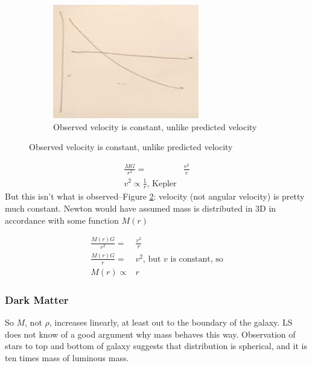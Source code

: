 \documentclass[]{article}
\begin{document}
\begin{figure}[H]
\begin{subfigure}[t]{0.45\textwidth}
	\end{subfigure}
	\begin{subfigure}[t]{0.45\textwidth}
		\caption{Observed velocity is constant, unlike predicted velocity}\label{fig:cosmo-6-velocity-curve}
		\includegraphics[width=\textwidth]{cosmo-6-velocity-curve}
	\end{subfigure}	
\end{figure}

\begin{align*}
	\frac{MG}{r^2} =& \frac{v^2}{r}\\
	v^2 \propto \frac{1}{r} \text{, Kepler}
\end{align*}
But this isn't what is observed--Figure \ref{fig:cosmo-6-velocity-curve}: velocity (not angular velocity) is pretty much constant. Newton would have assumed mass is distributed in 3D in accordance with some function $M(r)$

\begin{align*}
	\frac{M(r)G}{r^2} =& \frac{v^2}{r}\\
	\frac{M(r)G}{r} =& v^2 \text{, but $v$ is constant, so}\\
	M(r) \propto& r
\end{align*} 

\subsubsection{Dark Matter}
So $M$, not $\rho$, increases linearly, at least out to the boundary of the galaxy. LS does not know of a good argument why mass behaves this way. Observation of stars to top and bottom of galaxy suggests that distribution is spherical, and it is ten times mass of luminous mass.
\end{document}
